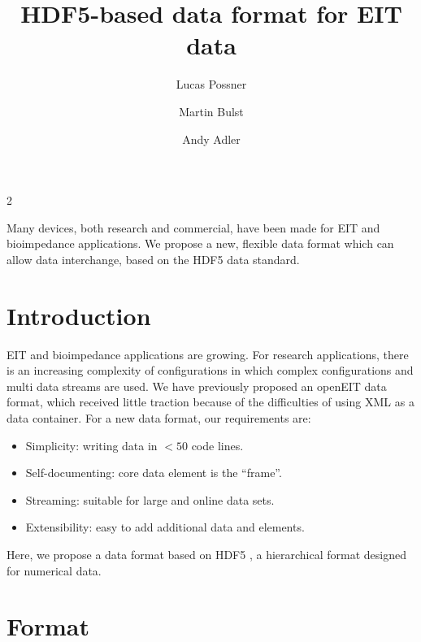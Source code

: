 \documentclass[10pt,a4paper]{article}
\title{HDF5-based data format for EIT data%
\vspace{-0.5ex}} %
\author[1]{Lucas Possner}
\author[1]{Martin Bulst}
\author[2]{Andy Adler}
\affil[1]{Sciospec Scientific Instruments GmbH, Leipzig, Germany}
\affil[2]{Carleton University, Ottawa, Canada}
\date{}
\begin{document}
\maketitle
\thispagestyle{firstpage}
\vspace{-1.5cm}

\begin{multicols}{2}

Many devices, both research and commercial, have been
made for EIT and bioimpedance applications. We propose
a new, flexible data format which can allow data
interchange, based on the HDF5 data standard.

\section{Introduction}
EIT and bioimpedance applications are growing. For 
research applications, there is an increasing
complexity of configurations in which complex
configurations and multi data streams are used.
We have previously proposed an openEIT data format\cite{Jones2014Open},
which received little traction because of the difficulties
of using XML as a data container.
%
For a new data format, our requirements are:
\begin{itemize}[itemsep=0ex, leftmargin=5mm,topsep=2mm]
\item Simplicity:
  writing data in $<50$ code lines. 
\item Self-documenting: 
  core data element is the ``frame''.
\item Streaming: suitable for large
  and online data sets.
\item Extensibility:
  easy to add additional data and elements.
\end{itemize}
Here, we propose a data format based on HDF5 \cite{HDF5Group},
a hierarchical format designed for numerical data.




\section{Format}


\end{multicols}
\end{document}
